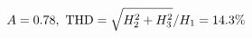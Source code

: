 \documentclass[preview]{standalone}
\begin{document}
\begin{align*}
\special{dvisvgm:raw <g id='unique000'>}A=0.78,\ \text{THD}=\sqrt{H_2^2+H_3^2}/H_1=14.3\%\special{dvisvgm:raw </g>}
\end{align*}
\end{document}
